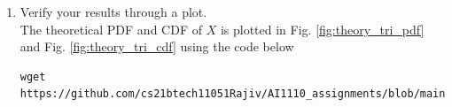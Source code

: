 \documentclass[journal,12pt,twocolumn]{IEEEtran}
\renewcommand\thesection{\arabic{section}}
\begin{document}
\begin{enumerate}[label=\thesection.\arabic*
,ref=\thesection.\theenumi]
\begin{align}
    	\begin{cases} 
    	0 & x < 0 \\
    	\int^{x}_{0} 1d\tau & 0 < x \le 1 \\
    	\int^{1}_{x-1} 1 d\tau & 1 < x \le 2 \\
    	0 & 2 \le x 
    	\end{cases} 
\end{align}
\begin{align}
	p_T\brak{x} &=
    	\begin{cases} 
    	0 & x \le 0 \\
    	x & 0 \le x < 1 \\
    	2-x & 1 \le x < 2 \\
    	0 & 2 \le x 
    	\end{cases} 
\end{align}
We integrate PDF to find CDF,
\begin{align}
	F_T\brak{x} &= \int_{-\infty}^{x} p_t\brak{z} dz \\
	F_T\brak{x} &=
    	\begin{cases} 
    	\int_{-\infty}^{x} 0dz & x \le 0 \\
    	F_T\brak{0} + \int_{0}^{x} z dz & 0 \le x < 1 \\
   		F_T\brak{1} + \int_{1}^{x} \brak{2-z} dz & 1 \le x < 2 \\
    	F_T\brak{2} + \int_{2}^{x} 0 dz & 2 \le x 
    	\end{cases} \\
	F_T\brak{x} &=
    	\begin{cases} 
    	0 & x \le 0 \\
    	\frac{x^2}{2} & 0 \le x < 1 \\
   		-\frac{x^2}{2} +2x - 1 & 1 \le x < 2 \\ 
    	1 & 2 \le x 
    	\end{cases} 
\end{align}
\item Verify your results through a plot. \\
\solution The theoretical PDF and CDF of $X$ is plotted in Fig. \ref{fig:theory_tri_pdf} and Fig.  \ref{fig:theory_tri_cdf}  using the code below
\begin{lstlisting}
wget https://github.com/cs21btech11051Rajiv/AI1110_assignments/blob/main/manual1/code/q4/4p5.c
\end{lstlisting}
\begin{figure}[ht!]
    \centering

\end{figure}
\end{enumerate}
\end{document}
